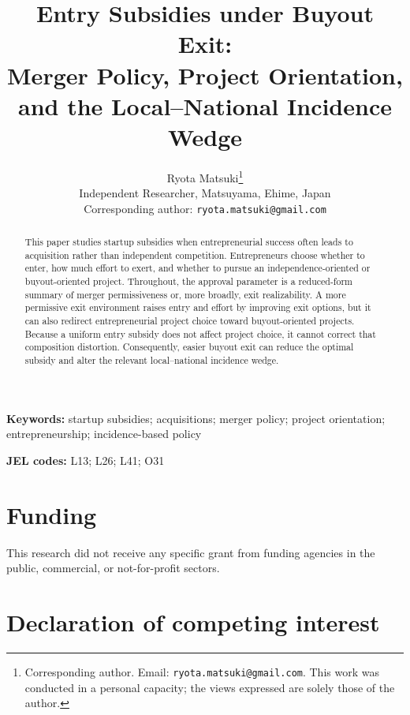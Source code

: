 \documentclass[11pt]{article}
\title{Entry Subsidies under Buyout Exit:\\
Merger Policy, Project Orientation, and the Local--National Incidence Wedge}
\author{Ryota Matsuki\thanks{Corresponding author. Email: \texttt{ryota.matsuki@gmail.com}. This work was conducted in a personal capacity; the views expressed are solely those of the author.}\\
\small Independent Researcher, Matsuyama, Ehime, Japan\\
\small Corresponding author: \texttt{ryota.matsuki@gmail.com}}
\date{}
\theoremstyle{plain}
\theoremstyle{remark}
\begin{document}
\maketitle

\begin{abstract}
This paper studies startup subsidies when entrepreneurial success often leads to acquisition rather than independent competition. Entrepreneurs choose whether to enter, how much effort to exert, and whether to pursue an independence-oriented or buyout-oriented project. Throughout, the approval parameter is a reduced-form summary of merger permissiveness or, more broadly, exit realizability. A more permissive exit environment raises entry and effort by improving exit options, but it can also redirect entrepreneurial project choice toward buyout-oriented projects. Because a uniform entry subsidy does not affect project choice, it cannot correct that composition distortion. Consequently, easier buyout exit can reduce the optimal subsidy and alter the relevant local--national incidence wedge.
\end{abstract}

\noindent
\textbf{Keywords:} startup subsidies; acquisitions; merger policy; project orientation; entrepreneurship; incidence-based policy

\noindent
\textbf{JEL codes:} L13; L26; L41; O31

\newpage










\appendix






\section*{Funding}

This research did not receive any specific grant from funding agencies in the public, commercial, or not-for-profit sectors.

\section*{Declaration of competing interest}
\end{document}
